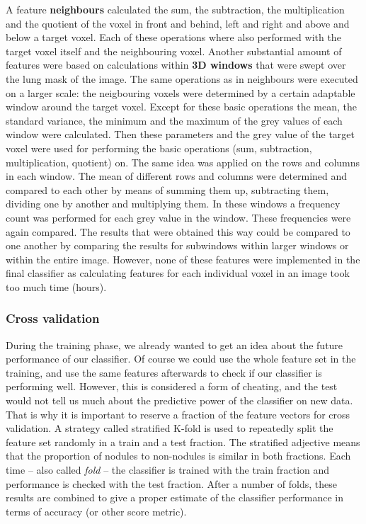 A feature \textbf{neighbours} calculated the sum, the subtraction, the
multiplication and the quotient of the voxel in front and behind, left and right
and above and below a target voxel. Each of these operations where also
performed with the target voxel itself and the neighbouring voxel. Another
substantial amount of features were based on calculations within \textbf{3D
windows} that were swept over the lung mask of the image. The same operations
as in neighbours were executed on a larger scale: the neigbouring voxels were
determined by a certain adaptable window around the target voxel. Except for
these basic operations the mean, the standard variance, the minimum and the
maximum of the grey values of each window were calculated. Then these parameters
and the grey value of the target voxel were used for performing the basic
operations (sum, subtraction, multiplication, quotient) on. The same idea was
applied on the rows and columns in each window. The mean of different rows and
columns were determined and compared to each other by means of summing them up,
subtracting them, dividing one by another and multiplying them. In these windows
a frequency count was performed for each grey value in the window. These
frequencies were again compared. The results that were obtained this way could
be compared to one another by comparing the results for subwindows within larger
windows or within the entire image. However, none of these features were
implemented in the final classifier as calculating features for each individual
voxel in an image took too much time (hours).

\subsubsection{Cross validation}
During the training phase, we already wanted to get an idea about the future
performance of our classifier. Of course we could use the whole feature set in
the training, and use the same features afterwards to check if our classifier is
performing well. However, this is considered a form of cheating, and the test
would not tell us much about the predictive power of the classifier on new data.
That is why it is important to reserve a fraction of the feature vectors for
cross validation. A strategy called stratified K-fold is used to repeatedly
split the feature set randomly in a train and a test fraction.
The stratified adjective means that the proportion of nodules to non-nodules is
similar in both fractions. Each time -- also called \textit{fold} -- the
classifier is trained with the train fraction and performance is checked with
the test fraction. After a number of folds, these results are combined to give a
proper estimate of the classifier performance in terms of accuracy (or other
score metric).

